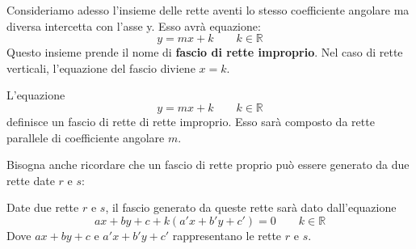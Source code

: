 \documentclass[10pt,a4paper]{article}
\begin{document}
	Consideriamo adesso l'insieme delle rette aventi lo stesso coefficiente angolare ma diversa intercetta con l'asse y. Esso avrà equazione:
	\begin{equation*}
		y = mx + k		\qquad	k \in \mathbb{R}
	\end{equation*}
	Questo insieme prende il nome di \textbf{fascio di rette improprio}. Nel caso di rette verticali, l'equazione del fascio diviene $x = k$.
	
	\begin{definition}
	L'equazione 
		\begin{equation*}
			y = mx + k \qquad k \in \mathbb{R}
		\end{equation*}
	definisce un fascio di rette di rette improprio. Esso sarà composto da  rette parallele di coefficiente angolare $m$. 
	
	
	\end{definition}

\begin{center}
\end{center} 

Bisogna anche ricordare che un fascio di rette proprio può essere generato da due rette date $r$ e $s$:
	\begin{definition}
		Date due rette $r$ e $s$, il fascio generato da queste rette sarà dato dall'equazione 
		\begin{equation*}
			ax + by + c + k(a'x + b'y + c')= 0	\qquad	k \in \mathbb{R}
		\end{equation*}
		Dove $ax + by + c$ e $a'x + b'y + c'$ rappresentano le rette $r$ e $s$.
	\end{definition}
	
\end{document}
